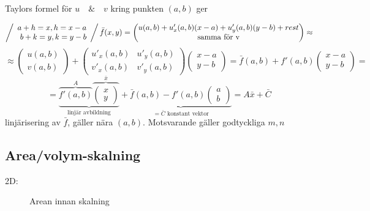 \documentclass{article}
\begin{document}
Taylors formel för \(u \quad\&\quad v\) kring punkten \((a,b)\) ger

\[
\left/\begin{array}{rcl}
	a+h = x, h = x-a \\
	b+k = y, k = y-b
\end{array}\right/
\bar{f}(x,y) = 
\begin{pmatrix}
	u(a,b) + u'_x(a,b)(x-a) + u'_y(a,b)(y-b) + rest \\
	\text{samma för v}
\end{pmatrix} \approx
\]
\[
\approx 
\begin{pmatrix}
	u(a,b) \\
	v(a,b)
\end{pmatrix}
+
\begin{pmatrix}
	u'_x(a,b) & u'_y(a,b) \\
	v'_x(a,b) & v'_y(a,b)
\end{pmatrix}
\begin{pmatrix}
	x-a \\
	y-b
\end{pmatrix}
= \bar{f}(a,b) + f'(a,b)
\begin{pmatrix}
	x-a \\
	y-b
\end{pmatrix} =
\]
\[
	= \underbrace{\overbrace{f'(a,b)}^{A}\overbrace{
	\begin{pmatrix}
		x \\
		y
	\end{pmatrix}}^{\bar{x}}}_{\text{linjär avbildning}}
	+ \underbrace{\bar{f}(a,b) - f'(a,b)
	\begin{pmatrix}
		a \\
		b
	\end{pmatrix}}_{=\bar{C}\text{ konstant vektor}}
	= A\bar{x} + \bar{C}
\]
linjärisering av \(\bar{f}\), gäller nära \((a,b)\). Motsvarande gäller godtyckliga \(m,n\)

\newpage
\subsection{Area/volym-skalning}
2D:

\begin{figure}[ht]
\usetikzlibrary{patterns}
  \caption{Arean innan skalning} \label{fig:7.1}
\end{figure}
\end{document}
